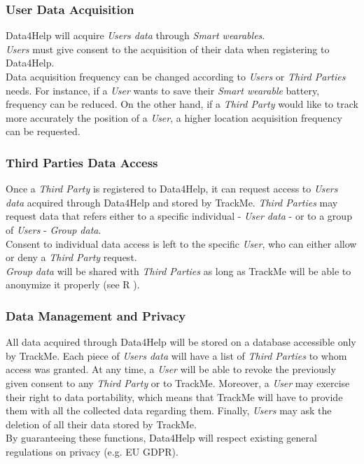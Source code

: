 \documentclass[../../rasd.tex]{subfiles}
\begin{document}
				\subsubsection{User Data Acquisition}
				Data4Help will acquire \textit{Users data} through \textit{Smart wearables}. \\
				\textit{Users} must give consent to the acquisition of their data when registering to Data4Help.\\
				Data acquisition frequency can be changed according to \textit{Users} or \textit{Third Parties} needs. For instance, if a \textit{User} wants to save their \textit{Smart wearable} battery, frequency can be reduced. On the other hand, if a \textit{Third Party} would like to track more accurately the position of a \textit{User}, a higher location acquisition frequency can be requested.	

				\subsubsection{Third Parties Data Access}
				Once a \textit{Third Party} is registered to Data4Help, it can request access to \textit{Users data} acquired through Data4Help and stored by TrackMe. \textit{Third Parties} may request data that refers either to a specific individual - \textit{User data} - or to a group of \textit{Users} - \textit{Group data}.\\
				Consent to individual data access is left to the specific \textit{User}, who can either allow or deny a \textit{Third Party} request.\\
				\textit{Group data} will be shared with \textit{Third Parties} as long as TrackMe will be able to anonymize it properly (see R ).

				\subsubsection{Data Management and Privacy}
				All data acquired through Data4Help will be stored on a database accessible only by TrackMe. Each piece of \textit{Users data} will have a list of \textit{Third Parties} to whom access was granted. At any time, a \textit{User} will be able to revoke the previously given consent to any \textit{Third Party} or to TrackMe. Moreover, a \textit{User} may exercise their right to data portability, which means that TrackMe will have to provide them with all the collected data regarding them. Finally, \textit{Users} may ask the deletion of all their data stored by TrackMe. \\
				By guaranteeing these functions, Data4Help will respect existing general regulations on privacy (e.g. EU GDPR).
			
\end{document}
